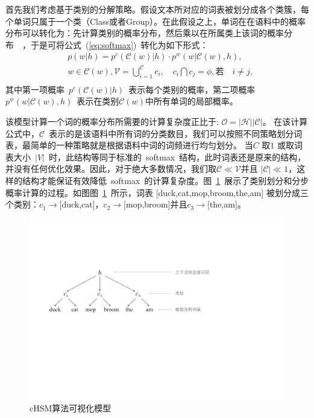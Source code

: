 首先我们考虑基于类别的分解策略。假设文本所对应的词表被划分成各个类簇，每个单词只属于一个类（Class或者Group）。在此假设之上，单词在在语料中的概率分布可以转化为：先计算类别的概率分布，然后乘以在所属类上该词的概率分布~~，于是可将公式~(\ref{eq:softmax})~转化为如下形式：
\begin{equation}
\begin{split}
&p(w|h)=p^c(\mathcal{C}(w)|h)\cdot p^w(w|\mathcal{C}(w),h) ,\\
 & w\in \mathcal{C}(w),\mathcal{V}=\bigcup _{i = 1}^\mathcal{C}{c_i}, \quad  c_i \bigcap c_j=\phi, \text{若}\quad i\ne j, \\
\end{split}
\end{equation}
其中第一项概率~$p^c(\mathcal{C}(w)|h)$~表示每个类别的概率，第二项概率~$p^w(w|\mathcal{C}(w),h)$~表示在类别$\mathcal{C}(w)$中所有单词的局部概率。

该模型计算一个词的概率分布所需要的计算复杂度正比于: $\mathcal{O =|H||C|}$。 在该计算公式中，$\mathcal{C}$~表示的是该语料中所有词的分类数目，我们可以按照不同策略划分词表，最简单的一种策略就是根据语料中词的词频进行均匀划分。 当$C$ 取$1$ 或取词表大小~$|V|$~时，此结构等同于标准的~softmax~结构，此时词表还是原来的结构，并没有任何优化效果。因此，对于绝大多数情况，我们取$\mathcal{C} \ll \mathcal{V}$并且 $|\mathcal{C}|\ll 1$，这样的结构才能保证有效降低~softmax~的计算复杂度。图~\ref{fig:case_hsm}~展示了类别划分和分步概率计算的过程。如图图~\ref{fig:case_hsm}~所示，词表 [duck,cat,mop,broom,the,am] 被划分成三个类别：$c_1\to$[duck,cat]，$c_2\to$[mop,broom]并且$c_3\to$[the,am]。
\begin{figure}[!t]
  \centering
\includegraphics[width=.9\linewidth]{./figures/case_chsm.pdf}
\caption{cHSM算法可视化模型}\label{fig:case_hsm}
\end{figure}

